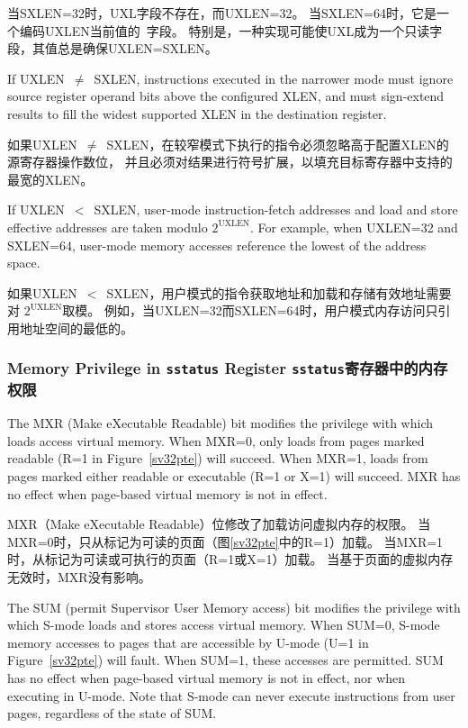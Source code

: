 当SXLEN=32时，UXL字段不存在，而UXLEN=32。
当SXLEN=64时，它是一个编码UXLEN当前值的\warl\ 字段。
特别是，一种实现可能使UXL成为一个只读字段，其值总是确保UXLEN=SXLEN。

If UXLEN~$\ne$~SXLEN, instructions executed in the narrower mode must ignore
source register operand bits above the configured XLEN, and must sign-extend
results to fill the widest supported XLEN in the destination register.

如果UXLEN~$\ne$~SXLEN，在较窄模式下执行的指令必须忽略高于配置XLEN的源寄存器操作数位，
并且必须对结果进行符号扩展，以填充目标寄存器中支持的最宽的XLEN。

If UXLEN~$<$~SXLEN, user-mode instruction-fetch addresses and load and store
effective addresses are taken modulo $2^{\text{UXLEN}}$.  For example, when UXLEN=32
and SXLEN=64, user-mode memory accesses reference the lowest 
of the address space.

如果UXLEN~$<$~SXLEN，用户模式的指令获取地址和加载和存储有效地址需要对 $2^{\text{UXLEN}}$取模。
例如，当UXLEN=32而SXLEN=64时，用户模式内存访问只引用地址空间的最低的。

\subsubsection{Memory Privilege in {\tt sstatus} Register {\tt sstatus}寄存器中的内存权限}
\label{sec:sum}

The MXR (Make eXecutable Readable) bit modifies the privilege with which loads
access virtual memory.  When MXR=0, only loads from pages marked readable (R=1
in Figure~\ref{sv32pte}) will succeed.  When MXR=1, loads from pages marked
either readable or executable (R=1 or X=1) will succeed.  MXR has no effect
when page-based virtual memory is not in effect.

MXR（Make eXecutable Readable）位修改了加载访问虚拟内存的权限。
当MXR=0时，只从标记为可读的页面（图\ref{sv32pte}中的R=1）加载。
当MXR=1时，从标记为可读或可执行的页面（R=1或X=1）加载。
当基于页面的虚拟内存无效时，MXR没有影响。

The SUM (permit Supervisor User Memory access) bit modifies the privilege with
which S-mode loads and stores access virtual memory.
When SUM=0, S-mode memory accesses to pages that are accessible by U-mode (U=1
in Figure~\ref{sv32pte}) will fault.  When SUM=1, these accesses are permitted.
SUM has no effect when page-based virtual memory is not in effect, nor when
executing in U-mode.  Note that S-mode can never execute instructions from user
pages, regardless of the state of SUM.

